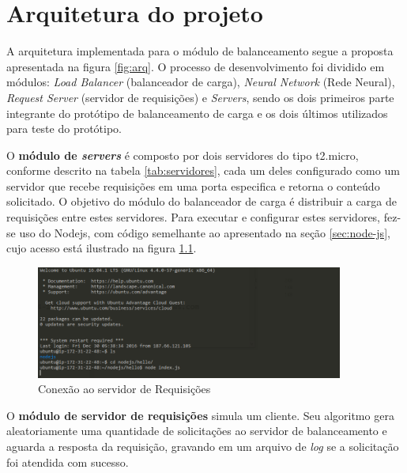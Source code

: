 \chapter{Arquitetura do projeto}\label{cap:desenvolvimento}

A arquitetura implementada para o módulo de balanceamento segue a proposta apresentada na figura \ref{fig:arq}. O processo de desenvolvimento foi dividido em módulos: \textit{Load Balancer} (balanceador de carga), \textit{Neural Network} (Rede Neural), \textit{Request Server} (servidor de requisições) e \textit{Servers}, sendo os dois primeiros parte integrante do protótipo de balanceamento de carga e os dois últimos utilizados para teste do protótipo. 

O \textbf{módulo de \textit{servers}} é composto por dois servidores do tipo t2.micro, conforme descrito na tabela \ref{tab:servidores}, cada um deles configurado como um servidor que recebe requisições em uma porta especifica e retorna o conteúdo solicitado. O objetivo do módulo do balanceador de carga é distribuir a carga de requisições entre estes servidores. Para executar e configurar estes servidores, fez-se uso do Nodejs, com código semelhante ao apresentado na seção \ref{sec:node-js}, cujo acesso está ilustrado na figura \ref{fig:serv-req}. 
\begin{figure}[htb]
	\caption{\label{fig:serv-req}Conexão ao servidor de Requisições}
	\begin{center}
		\includegraphics[width=0.90\textwidth]{img/servidor.png}
	\end{center}
\end{figure}

O \textbf{módulo de servidor de requisições} simula um cliente. Seu algoritmo gera aleatoriamente uma quantidade de solicitações ao servidor de balanceamento e aguarda a resposta da requisição, gravando em um arquivo de \textit{log} se a solicitação foi atendida com sucesso. 

